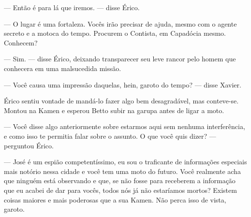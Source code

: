 --- Então é para lá que iremos. --- disse Érico.

--- O lugar é uma fortaleza. Vocês irão precisar de ajuda, mesmo com o
agente secreto e a motoca do tempo. Procurem o Contista, em Capadócia
mesmo. Conhecem?

--- Sim. --- disse Érico, deixando transparecer seu leve rancor pelo
homem que conhecera em uma malsucedida missão.

--- Você causa uma impressão daquelas, hein, garoto do tempo? --- disse
Xavier.

Érico sentiu vontade de mandá-lo fazer algo bem desagradável, mas
conteve-se. Montou na Kamen e esperou Betto subir na garupa antes de
ligar a moto.

--- Você disse algo anteriormente sobre estarmos aqui sem nenhuma
interferência, e como isso te permitia falar sobre o assunto. O que você
quis dizer? --- perguntou Érico.

--- José é um espião competentíssimo, eu sou o traficante de informações
especiais mais notório nessa cidade e você tem uma moto do futuro. Você
realmente acha que ninguém está observando e que, se não fosse para
receberem a informação que eu acabei de dar para vocês, todos nós já não
estaríamos mortos? Existem coisas maiores e mais poderosas que a sua
Kamen. Não perca isso de vista, garoto.
